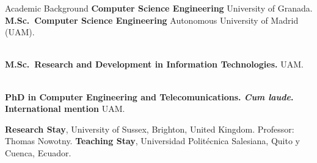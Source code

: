\begin{rubric}{Academic Background}
\entry*[2014 -- 2018]%
	\textbf{Computer Science Engineering} University of Granada.
%
\entry*[2018 -- 2019]%
	\textbf{M.Sc.~Computer Science Engineering} Autonomous University of Madrid (UAM).\par
\\\vspace{-35pt}
\entry*[2018 -- 2019]%
	\textbf{M.Sc.~Research and Development in Information Technologies.} UAM.\par
\\\vspace{-30pt}
\entry*[2020 -- 2024]%
	\textbf{PhD in Computer Engineering and Telecomunications. \textit{Cum laude}. International mention} UAM.\par
    
 \textbf{Research Stay}, University of Sussex, Brighton, United Kingdom. Professor: Thomas Nowotny.
\entry*[December 1st-9th, 2025] \textbf{Teaching Stay}, Universidad Politécnica Salesiana, Quito y Cuenca, Ecuador.


\end{rubric}